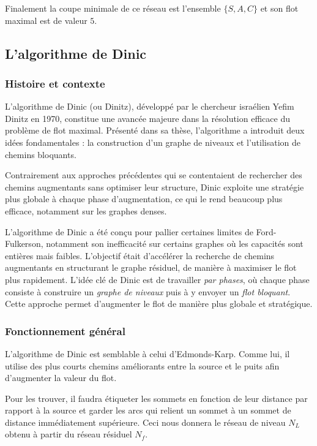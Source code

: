 \documentclass[a4paper]{article}
\begin{document}
Finalement la coupe minimale de ce réseau est l'ensemble $\{S,A,C\}$ et son flot maximal est de valeur $5$.
\subsection{L'algorithme de Dinic}

\subsubsection{Histoire et contexte}

L’algorithme de Dinic (ou Dinitz), développé par le chercheur israélien Yefim Dinitz en 1970, constitue une avancée majeure dans la résolution efficace du problème de flot maximal. Présenté dans sa thèse, l’algorithme a introduit deux idées fondamentales : la construction d’un graphe de niveaux et l’utilisation de chemins bloquants\cite{article}.

Contrairement aux approches précédentes qui se contentaient de rechercher des chemins augmentants sans optimiser leur structure, Dinic exploite une stratégie plus globale à chaque phase d’augmentation, ce qui le rend beaucoup plus efficace, notamment sur les graphes denses.

L’algorithme de Dinic a été conçu pour pallier certaines limites de Ford-Fulkerson, notamment son inefficacité sur certains graphes où les capacités sont entières mais faibles. L'objectif était d’accélérer la recherche de chemins augmentants en structurant le graphe résiduel, de manière à maximiser le flot plus rapidement. L’idée clé de Dinic est de travailler \textit{par phases}, où chaque phase consiste à construire un \textit{graphe de niveaux} puis à y envoyer un \textit{flot bloquant}. Cette approche permet d’augmenter le flot de manière plus globale et stratégique.

\subsubsection{Fonctionnement général}
L'algorithme de Dinic est semblable à celui d'Edmonds-Karp. Comme lui, il utilise des plus courts chemins améliorants entre la source et le puits afin d'augmenter la valeur du flot. 

Pour les trouver, il faudra étiqueter les sommets en fonction de leur distance par rapport à la source et garder les arcs qui relient un sommet à un sommet de distance immédiatement supérieure. Ceci nous donnera le réseau de niveau $N_L$ obtenu à partir du réseau résiduel $N_f$.
\end{document}
